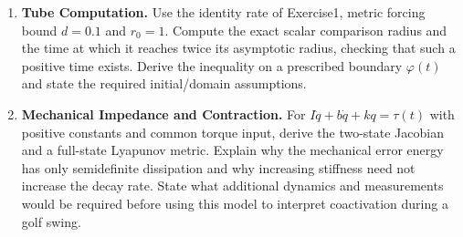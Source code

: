 \begin{enumerate}
\item \textbf{Tube Computation.} Use the identity rate of Exercise1, metric forcing bound $d=0.1$ and $r_0=1$. Compute the exact scalar comparison radius and the time at which it reaches twice its asymptotic radius, checking that such a positive time exists. Derive the inequality on a prescribed boundary $\varphi(t)$ and state the required initial/domain assumptions.
\item \textbf{Mechanical Impedance and Contraction.} For $I\ddot q+b\dot q+kq=\tau(t)$ with positive constants and common torque input, derive the two-state Jacobian and a full-state Lyapunov metric. Explain why the mechanical error energy has only semidefinite dissipation and why increasing stiffness need not increase the decay rate. State what additional dynamics and measurements would be required before using this model to interpret coactivation during a golf swing.
\end{enumerate}
